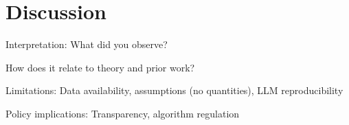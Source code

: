 \section{Discussion}\label{sec:dis}

Interpretation: What did you observe?

How does it relate to theory and prior work?

Limitations: Data availability, assumptions (no quantities), LLM reproducibility

Policy implications: Transparency, algorithm regulation

